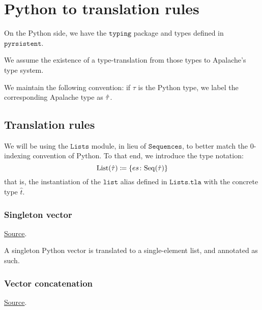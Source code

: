 \section{Python to \tlap{} translation rules}

On the Python side, we have the $\texttt{typing}$ package and types defined in $\texttt{pyrsistent}$. 

We assume the existence of a type-translation from those types to Apalache's type system.

We maintain the following convention: if $\tau$ is the Python type, we label the corresponding Apalache type as $\htau$.

\subsection{Translation rules}

We will be using the \href{https://github.com/konnov/tlaki/blob/main/src/Lists.tla}{$\texttt{Lists}$} module, in lieu of $\texttt{Sequences}$, to better match the 0-indexing convention of Python. To that end, we introduce the type notation:
\[
\List(\htau) \coloneqq \{ es\colon \Seq(\htau) \}
\]
that is, the instantiation of the $\texttt{list}$ alias defined in $\texttt{Lists.tla}$ with the concrete type $\hat{t}$.

\subsubsection{Singleton vector}
\href{https://github.com/saltiniroberto/ssf/blob/7ea6e18093d9da3154b4e396dd435549f687e6b9/high_level/common/pythonic_code_generic.py#L15-L16}{Source}.



\begin{mathpar}
\end{mathpar}
A singleton Python vector is translated to a single-element list, and annotated as such.

\subsubsection{Vector concatenation}
\href{https://github.com/saltiniroberto/ssf/blob/7ea6e18093d9da3154b4e396dd435549f687e6b9/high_level/common/pythonic_code_generic.py#L19-L20}{Source}.


